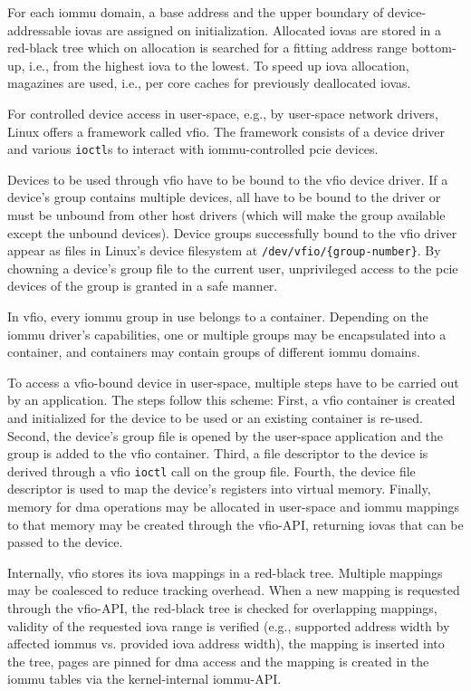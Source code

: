 For each \ac{iommu} domain, a base address and the upper boundary of
device-addressable \acp{iova} are assigned on initialization. Allocated
\acp{iova} are stored in a red-black tree which on allocation is searched for a
fitting address range bottom-up, i.e., from the highest \ac{iova} to the lowest.
To speed up \ac{iova} allocation, magazines are used, i.e., per core caches for
previously deallocated \acp{iova}.

For controlled device access in user-space, e.g., by user-space network drivers,
Linux offers a framework called \ac{vfio}. The framework consists of a device
driver and various \texttt{ioctl}s to interact with \ac{iommu}-controlled
\ac{pcie} devices.

Devices to be used through \ac{vfio} have to be bound to the \ac{vfio} device
driver. If a device's group contains multiple devices, all have to be bound to
the driver or must be unbound from other host drivers (which will make the group
available except the unbound devices). Device groups successfully bound to the
\ac{vfio} driver appear as files in Linux's device filesystem at
\texttt{/dev/vfio/\{group-number\}}. By chowning a device's group file to the
current user, unprivileged access to the \ac{pcie} devices of the group is
granted in a safe manner.

In \ac{vfio}, every \ac{iommu} group in use belongs to a container. Depending on
the \ac{iommu} driver's capabilities, one or multiple groups may be encapsulated
into a container, and containers may contain groups of different \ac{iommu}
domains.

To access a \ac{vfio}-bound device in user-space, multiple steps have to be
carried out by an application. The steps follow this scheme: First, a \ac{vfio}
container is created and initialized for the device to be used or an existing
container is re-used. Second, the device's group file is opened by the
user-space application and the group is added to the \ac{vfio} container. Third,
a file descriptor to the device is derived through a \ac{vfio} \texttt{ioctl}
call on the group file. Fourth, the device file descriptor is used to map the
device's registers into virtual memory. Finally, memory for \ac{dma} operations
may be allocated in user-space and \ac{iommu} mappings to that memory may be
created through the \ac{vfio}-API, returning \acp{iova} that can be passed to
the device.

Internally, \ac{vfio} stores its \ac{iova} mappings in a red-black tree.
Multiple mappings may be coalesced to reduce tracking overhead. When a new
mapping is requested through the \ac{vfio}-API, the red-black tree is checked
for overlapping mappings, validity of the requested \ac{iova} range is verified
(e.g., supported address width by affected \acp{iommu} vs. provided \ac{iova}
address width), the mapping is inserted into the tree, pages are pinned for
\ac{dma} access and the mapping is created in the \ac{iommu} tables via the
kernel-internal \ac{iommu}-API.


